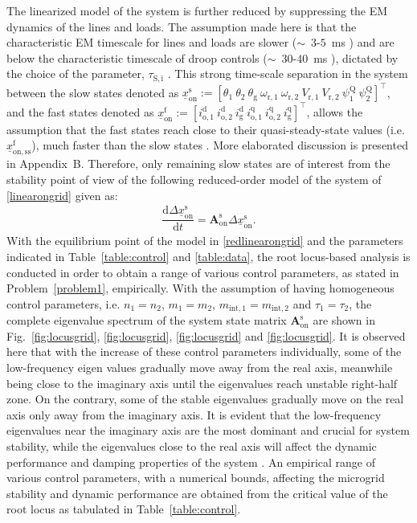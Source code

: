 \documentclass[journal]{IEEEtran}
\begin{document}
The linearized model of the system is further reduced by suppressing the EM dynamics of the lines and loads. The assumption made here is that the characteristic EM timescale for lines and loads are slower ($\sim$~$3$-$5$~ms \cite{kundur}) and are below the characteristic timescale of droop controls ($\sim$~$30$-$40$~ms \cite{green}), dictated by the choice of the parameter, $\tau_\mathrm{S,i}$ \cite{dhople}. This strong time-scale separation in the system between the slow states denoted as $\underline{x}_\mathrm{on}^\mathrm{s}:=[\theta_\mathrm{1}~\theta_\mathrm{2}~\theta_\mathrm{g}~\omega_\mathrm{r,1}~\omega_\mathrm{r,2}~V_\mathrm{r,1}~V_\mathrm{r,2}~\psi^\mathrm{Q}_\mathrm{1}~\psi^\mathrm{Q}_\mathrm{2}]^\top$, and the fast states denoted as $\underline{x}_\mathrm{on}^\mathrm{f}:=[i_\mathrm{o,1}^\mathrm{d}~i_\mathrm{o,2}^\mathrm{d}~i_\mathrm{g}^\mathrm{d}~i_\mathrm{o,1}^\mathrm{q}~i_\mathrm{o,2}^\mathrm{q}~i_\mathrm{g}^\mathrm{q}]^\top$, allows the assumption that the fast states reach close to their quasi-steady-state values (i.e. $\underline{x}_\mathrm{on,ss}^\mathrm{f}$), much faster than the slow states \cite{modred1,modred2}. More elaborated discussion is presented in Appendix~B. Therefore, only remaining slow states are of interest from the stability point of view of the following reduced-order model of the system of \eqref{linearongrid} given as:
\begin{align}\label{redlinearongrid}
        \dfrac{\mathrm{d}\Delta \underline{x}_\mathrm{on}^\mathrm{s}}{\mathrm{d}t}=\mathbf{A}_\mathrm{{on}}^\mathrm{{s}}\Delta \underline{x}_\mathrm{on}^\mathrm{s}.
\end{align}
With the equilibrium point of the model in \eqref{redlinearongrid} and the parameters indicated in Table~\ref{table:control} and \ref{table:data}, the root locus-based analysis is conducted in order to obtain a range of various control parameters, as stated in Problem~\ref{problem1}, empirically. With the assumption of having homogeneous control parameters, i.e. $n_\mathrm{1}=n_\mathrm{2}$, $m_\mathrm{1}=m_\mathrm{2}$, $m_\mathrm{int,1}=m_\mathrm{int,2}$ and $\tau_\mathrm{1}=\tau_\mathrm{2}$, the complete eigenvalue spectrum of the system state matrix $\mathbf{A}^\mathrm{{s}}_\mathrm{{on}}$ are shown in Fig.~\ref{fig:locusgrid}, \ref{fig:locusgrid}, \ref{fig:locusgrid} and \ref{fig:locusgrid}. It is observed here that with the increase of these control parameters individually, some of the low-frequency eigen values gradually move away from the real axis, meanwhile being close to the imaginary axis until the eigenvalues reach unstable right-half zone. On the contrary, some of the stable eigenvalues gradually move on the real axis only away from the imaginary axis. It is evident that the low-frequency eigenvalues near the imaginary axis are the most dominant and crucial for system stability, while the eigenvalues close to the real axis will affect the dynamic performance and damping properties of the system \cite{muller}. An empirical range of various control parameters, with a numerical bounds, affecting the microgrid stability and dynamic performance are obtained from the critical value of the root locus as tabulated in Table~\ref{table:control}.
\end{document}
